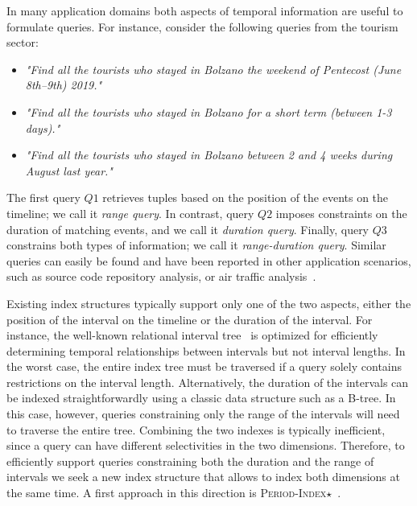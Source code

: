 \documentclass[sigconf,nonacm,anonymous]{acmart}
\theoremstyle{definition}
\newcommand{\algo}[1]{\textsc{#1}}
\begin{document}
In many application domains both aspects of temporal information are
useful to formulate queries.  For instance, consider the following
queries from the tourism sector:
\begin{itemize}
	\item[$Q1$:] \emph{"Find all the tourists who stayed in Bolzano the weekend of Pentecost (June 8th--9th) 2019."}
	\item[$Q2$:] \emph{"Find all the tourists who stayed in Bolzano for a short term (between 1-3 days)."}
	\item[$Q3$:] \emph{"Find all the tourists who stayed in Bolzano between 2 and 4 weeks during August last year."}
\end{itemize}
%
%
The first query $Q1$ retrieves tuples based on the position of the
events on the timeline; we call it \emph{range query}.  In contrast,
query $Q2$ imposes constraints on the duration of matching events, and
we call it \emph{duration query}.  Finally, query $Q3$ constrains both
types of information; we call it \emph{range-duration query}.  Similar
queries can easily be found and have been reported in other
application scenarios, such as source code repository analysis, or air
traffic
analysis~\cite{DBLP:conf/gis/SchullerBM10,DBLP:conf/adbis/BehrendMSW09,DBLP:conf/adbis/SchullerSB12}.

Existing index structures typically support only one of the two
aspects, either the position of the interval on the timeline or the
duration of the interval.  For instance, the well-known relational
interval tree~\cite{DBLP:conf/vldb/KriegelPS00} is optimized for
efficiently determining temporal relationships between intervals but
not interval lengths. In the worst case, the entire index tree must be
traversed if a query solely contains restrictions on the interval
length.  Alternatively, the duration of the intervals can be indexed
straightforwardly using a classic data structure such as a B-tree.  In
this case, however, queries constraining only the range of the
intervals will need to traverse the entire tree.
%
Combining the two indexes is typically inefficient, since a query can
have different selectivities in the two dimensions.
%
Therefore, to efficiently support queries constraining both the
duration and the range of intervals we seek a new index structure that
allows to index both dimensions at the same time.  A first approach in
this direction is
\algo{Period-Index$\star$}~\cite{BehrendDGSVRK_SSTD19_period-index}.
\end{document}
